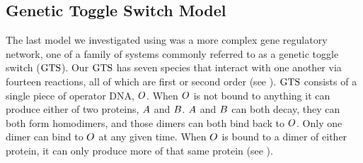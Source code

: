\subsection{Genetic Toggle Switch Model}
\label{sec:gts}
The last model we investigated using  was a more complex gene regulatory network, one of a family of systems commonly referred to as a genetic toggle switch ($\text{GTS}$)\supercite{Gardner:2000bm}. Our $\text{GTS}$ has seven species that interact with one another via fourteen reactions, all of which are first or second order (see ). $\text{GTS}$ consists of a single piece of operator DNA, $O$. When $O$ is not bound to anything it can produce either of two proteins, $A$ and $B$. $A$ and $B$ can both decay, they can both form homodimers, and those dimers can both bind back to $O$. Only one dimer can bind to $O$ at any given time. When $O$ is bound to a dimer of either protein, it can only produce more of that same protein (see ).

